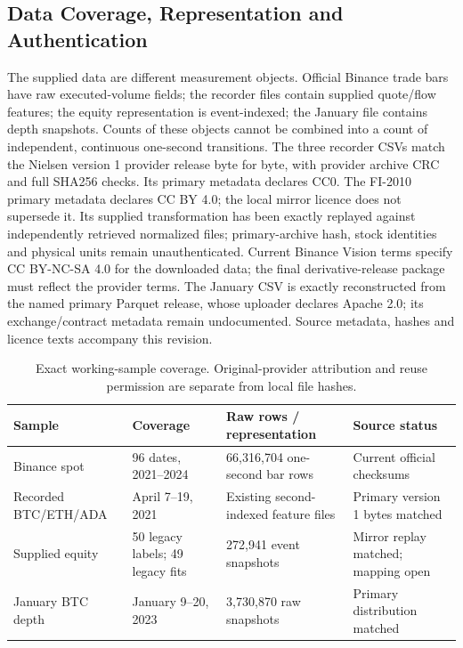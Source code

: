 \documentclass[12pt]{article}
\theoremstyle{definition}
\theoremstyle{remark}
\begin{document}
\subsection{Data Coverage, Representation and Authentication}
The supplied data are different measurement objects. Official Binance trade bars have raw executed-volume fields; the recorder files contain supplied quote/flow features; the equity representation is event-indexed; the January file contains depth snapshots. Counts of these objects cannot be combined into a count of independent, continuous one-second transitions. The three recorder CSVs match the Nielsen version 1 provider release byte for byte, with provider archive CRC and full SHA256 checks. Its primary metadata declares CC0. The FI-2010 primary metadata declares CC BY 4.0; the local mirror licence does not supersede it. Its supplied transformation has been exactly replayed against independently retrieved normalized files; primary-archive hash, stock identities and physical units remain unauthenticated. Current Binance Vision terms specify CC BY-NC-SA 4.0 for the downloaded data; the final derivative-release package must reflect the provider terms. The January CSV is exactly reconstructed from the named primary Parquet release, whose uploader declares Apache 2.0; its exchange/contract metadata remain undocumented. Source metadata, hashes and licence texts accompany this revision. 
\begin{table}[htbp]
\centering\footnotesize\setlength{\tabcolsep}{3pt}
\caption{Exact working-sample coverage. Original-provider attribution and reuse permission are separate from local file hashes.}
\label{tab:datasets}
\begin{tabularx}{\textwidth}{lXXX}\toprule
Sample & Coverage & Raw rows / representation & Source status \\\midrule
Binance spot & 96 dates, 2021--2024 & 66,316,704 one-second bar rows & Current official checksums \\
Recorded BTC/ETH/ADA & April 7--19, 2021 & Existing second-indexed feature files & Primary version 1 bytes matched \\
Supplied equity & 50 legacy labels; 49 legacy fits & 272,941 event snapshots & Mirror replay matched; mapping open \\
January BTC depth & January 9--20, 2023 & 3,730,870 raw snapshots & Primary distribution matched \\
\bottomrule\end{tabularx}
\end{table}
\end{document}
